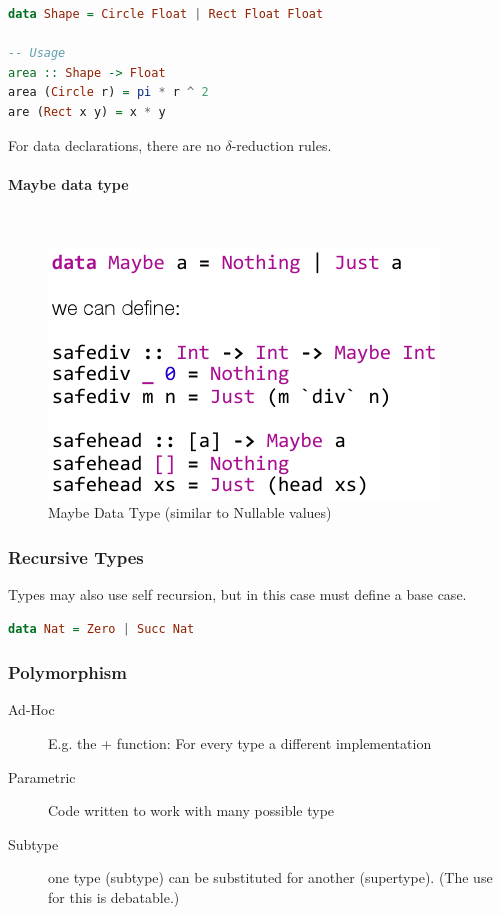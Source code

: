 \begin{lstlisting}[language=haskell]
data Shape = Circle Float | Rect Float Float

-- Usage
area :: Shape -> Float
area (Circle r) = pi * r ^ 2
are (Rect x y) = x * y
\end{lstlisting}

For data declarations, there are no $\delta$-reduction rules.


\paragraph{Maybe data type} \hfill \\
\begin{figure}[h!]
\centering
\includegraphics[width=0.5\linewidth]{images/haskell_maybe_type}
\caption{Maybe Data Type (similar to Nullable values)}
\label{fig:haskellmaybetype}
\end{figure}

\subsubsection{Recursive Types}
Types may also use self recursion, but in this case must define a base case.

\begin{lstlisting}[language=haskell]
data Nat = Zero | Succ Nat
\end{lstlisting}

\subsubsection{Polymorphism}
\begin{description}
	\item[Ad-Hoc] E.g. the + function: For every type a different implementation
	\item[Parametric] Code written to work with many possible type
	\item[Subtype] one type (subtype) can be substituted for another (supertype). (The use for this is debatable.)
\end{description}

